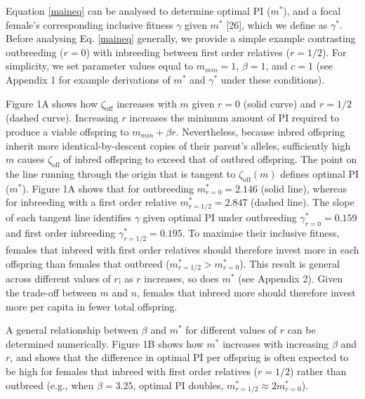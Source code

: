 \documentclass[12pt]{article}
\begin{document}
Equation \ref{maineq} can be analysed to determine optimal PI ($m^{*}$), and a focal female's corresponding inclusive fitness $\gamma$ given $m^{*}$ [26], which we define as $\gamma^{*}$. Before analysing Eq. \ref{maineq} generally, we provide a simple example contrasting outbreeding ($r=0$) with inbreeding between first order relatives ($r=1/2$). For simplicity, we set parameter values equal to $m_{min}=1$, $\beta=1$, and $c=1$ (see Appendix 1 for example derivations of $m^{*}$ and $\gamma^{*}$ under these conditions).

Figure 1A shows how $\zeta_{\textrm{off}}$ increases with $m$ given $r=0$ (solid curve) and $r=1/2$ (dashed curve). Increasing $r$ increases the minimum amount of PI required to produce a viable offspring to $m_{min}+\beta r$. Nevertheless, because inbred offspring inherit more identical-by-descent copies of their parent's alleles, sufficiently high $m$ causes $\zeta_{\textrm{off}}$ of inbred offspring to exceed that of outbred offspring. The point on the line running through the origin that is tangent to $\zeta_{\textrm{off}}(m)$ defines optimal PI ($m^{*}$). Figure 1A shows that for outbreeding $m^{*}_{r=0}=2.146$ (solid line), whereas for inbreeding with a first order relative $m^{*}_{r=1/2}=2.847$ (dashed line). The slope of each tangent line identifies $\gamma$ given optimal PI under outbreeding $\gamma^{*}_{r=0}=0.159$ and first order inbreeding $\gamma^{*}_{r=1/2}=0.195$. To maximise their inclusive fitness, females that inbreed with first order relatives should therefore invest more in each offspring than females that outbreed ($m^{*}_{r=1/2}>m^{*}_{r=0}$). This result is general across different values of $r$; as $r$ increases, so does $m^{*}$ (see Appendix 2). Given the trade-off between $m$ and $n$, females that inbreed more should therefore invest more per capita in fewer total offspring. 

A general relationship between $\beta$ and $m^{*}$ for different values of $r$ can be determined numerically. Figure 1B shows how $m^{*}$ increases with increasing $\beta$ and $r$, and shows that the difference in optimal PI per offspring is often expected to be high for females that inbreed with first order relatives ($r=1/2$) rather than outbreed (e.g., when $\beta=3.25$, optimal PI doubles, $m^{*}_{r=1/2} \approx 2m^{*}_{r=0}$).
\end{document}

